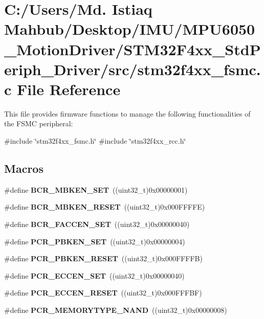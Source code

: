 \section{C\+:/\+Users/\+Md. Istiaq Mahbub/\+Desktop/\+I\+M\+U/\+M\+P\+U6050\+\_\+\+Motion\+Driver/\+S\+T\+M32\+F4xx\+\_\+\+Std\+Periph\+\_\+\+Driver/src/stm32f4xx\+\_\+fsmc.c File Reference}
\label{stm32f4xx__fsmc_8c}


This file provides firmware functions to manage the following functionalities of the F\+S\+MC peripheral\+:  


{\ttfamily \#include \char`\"{}stm32f4xx\+\_\+fsmc.\+h\char`\"{}}\newline
{\ttfamily \#include \char`\"{}stm32f4xx\+\_\+rcc.\+h\char`\"{}}\newline
\subsection*{Macros}
\begin{DoxyCompactItemize}
\item 
\#define \textbf{ B\+C\+R\+\_\+\+M\+B\+K\+E\+N\+\_\+\+S\+ET}~((uint32\+\_\+t)0x00000001)
\item 
\#define \textbf{ B\+C\+R\+\_\+\+M\+B\+K\+E\+N\+\_\+\+R\+E\+S\+ET}~((uint32\+\_\+t)0x000\+F\+F\+F\+F\+E)
\item 
\#define \textbf{ B\+C\+R\+\_\+\+F\+A\+C\+C\+E\+N\+\_\+\+S\+ET}~((uint32\+\_\+t)0x00000040)
\item 
\#define \textbf{ P\+C\+R\+\_\+\+P\+B\+K\+E\+N\+\_\+\+S\+ET}~((uint32\+\_\+t)0x00000004)
\item 
\#define \textbf{ P\+C\+R\+\_\+\+P\+B\+K\+E\+N\+\_\+\+R\+E\+S\+ET}~((uint32\+\_\+t)0x000\+F\+F\+F\+F\+B)
\item 
\#define \textbf{ P\+C\+R\+\_\+\+E\+C\+C\+E\+N\+\_\+\+S\+ET}~((uint32\+\_\+t)0x00000040)
\item 
\#define \textbf{ P\+C\+R\+\_\+\+E\+C\+C\+E\+N\+\_\+\+R\+E\+S\+ET}~((uint32\+\_\+t)0x000\+F\+F\+F\+B\+F)
\item 
\#define \textbf{ P\+C\+R\+\_\+\+M\+E\+M\+O\+R\+Y\+T\+Y\+P\+E\+\_\+\+N\+A\+ND}~((uint32\+\_\+t)0x00000008)
\end{DoxyCompactItemize}
